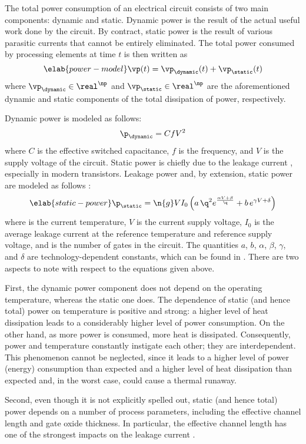 The total power consumption of an electrical circuit consists of two main
components: dynamic and static. Dynamic power is the result of the actual useful
work done by the circuit. By contract, static power is the result of various
parasitic currents that cannot be entirely eliminated. The total power consumed
by \np processing elements at time $t$ is then written as
\begin{equation} \elab{power-model}
  \vp(t) = \vp_\dynamic(t) + \vp_\static(t)
\end{equation}
where $\vp_\dynamic \in \real^\np$ and $\vp_\static \in \real^\np$ are the
aforementioned dynamic and static components of the total dissipation of power,
respectively.

Dynamic power is modeled as follows:
\[
  \p_\dynamic = C f V^2
\]
where $C$ is the effective switched capacitance, $f$ is the frequency, and $V$
is the supply voltage of the circuit. Static power is chiefly due to the leakage
current \cite{chandrakasan2000, srivastava2010, juan2011, juan2012}, especially
in modern  transistors. Leakage power and, by extension, static power
are modeled as follows \cite{liao2005, yang2010}:
\begin{equation} \elab{static-power}
  \p_\static = \n{g} V I_0 \left(a \, \q^2 e^{\frac{\alpha V + \beta}{\q}} + b \, e^{\gamma V + \delta}\right)
\end{equation}
where \q is the current temperature, $V$ is the current supply voltage, $I_0$ is
the average leakage current at the reference temperature and reference supply
voltage, and  is the number of gates in the circuit. The quantities $a$,
$b$, $\alpha$, $\beta$, $\gamma$, and $\delta$ are technology-dependent
constants, which can be found in \cite{liao2005}. There are two aspects to note
with respect to the equations given above.

First, the dynamic power component does not depend on the operating temperature,
whereas the static one does. The dependence of static (and hence total) power on
temperature is positive and strong: a higher level of heat dissipation leads to
a considerably higher level of power consumption. On the other hand, as more
power is consumed, more heat is dissipated. Consequently, power and temperature
constantly instigate each other; they are interdependent. This phenomenon cannot
be neglected, since it leads to a higher level of power (energy) consumption
than expected and a higher level of heat dissipation than expected and, in the
worst case, could cause a thermal runaway.

Second, even though it is not explicitly spelled out, static (and hence total)
power depends on a number of process parameters, including the effective channel
length and gate oxide thickness. In particular, the effective channel length has
one of the strongest impacts on the leakage current \cite{juan2012}.

